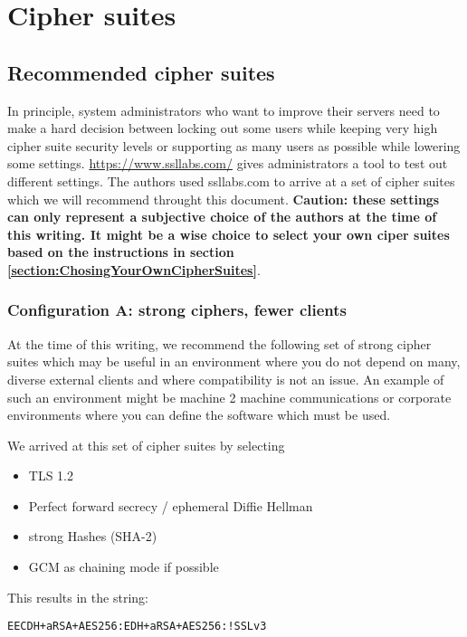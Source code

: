 \section{Cipher suites}


\subsection{Recommended cipher suites}

In principle, system administrators who want to improve their servers need to
make a hard decision between locking out some users while keeping very high
cipher suite security levels or supporting as many users as possible while
lowering some settings. \url{https://www.ssllabs.com/} gives administrators a
tool to test out different settings. The authors used ssllabs.com to arrive at
a set of cipher suites which we will recommend throught this document.
\textbf{Caution: these settings can only represent a subjective choice of the
authors at the time of this writing. It might be a wise choice to select your
own ciper suites based on the instructions in section
\ref{section:ChosingYourOwnCipherSuites}}.


\subsubsection{Configuration A: strong ciphers, fewer clients}

At the time of this writing, we recommend the following set of strong cipher suites which may be useful in an environment where you do not depend on many, diverse external clients and where compatibility is not an issue.  An example of such an environment might be machine 2 machine communications or corporate environments where you can define the software which must be used.


We arrived at this set of cipher suites by selecting

\begin{itemize}
\item TLS 1.2
\item Perfect forward secrecy / ephemeral Diffie Hellman
\item strong Hashes (SHA-2)
\item GCM as chaining mode if possible 
\end{itemize}

This results in the string:

\begin{verbatim}
EECDH+aRSA+AES256:EDH+aRSA+AES256:!SSLv3
\end{verbatim}

